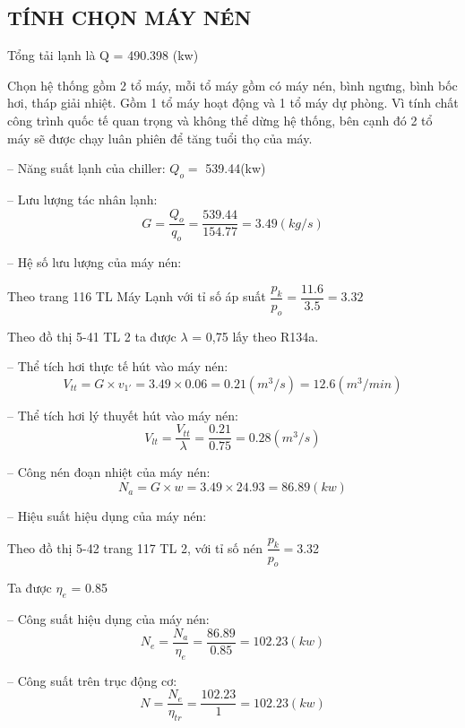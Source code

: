 \begin{table}[H]
\subsection{TÍNH CHỌN MÁY NÉN}
Tổng tải lạnh là Q = 490.398 (kw)

Chọn hệ thống gồm 2 tổ máy, mỗi tổ máy gồm có máy nén, bình ngưng, bình bốc hơi, tháp giải nhiệt. Gồm 1 tổ máy hoạt động và 1 tổ máy dự phòng. Vì tính chất công trình quốc tế quan trọng và không thể dừng hệ thống, bên cạnh đó 2 tổ máy sẽ được chạy luân phiên để tăng tuổi thọ của máy.

-- Năng suất lạnh của chiller: $Q_{o} = $ 539.44(kw)

-- Lưu lượng tác nhân lạnh: 
\begin{equation*}
	G = \dfrac{Q_{o}}{q_{o}} = \dfrac{539.44}{154.77} = 3.49 (kg/s)
\end{equation*}

-- Hệ số lưu lượng của máy nén: 

Theo trang 116 TL Máy Lạnh với tỉ số áp suất $\dfrac{p_{k}}{p_{o}} = \dfrac{11.6}{3.5} = 3.32$
	
Theo đồ thị 5-41 TL 2 ta được $\lambda$ = 0,75 lấy theo R134a.


-- Thể tích hơi thực tế hút vào máy nén: 
\begin{equation*}
	V_{tt} = G \times v_{1'} = 3.49 \times 0.06 = 0.21(m^3/s) = 12.6(m^3/min)
\end{equation*}

-- Thể tích hơi lý thuyết hút vào máy nén:
\begin{equation*}
	V_{lt} = \dfrac{V_{tt}}{\lambda} = \dfrac{0.21}{0.75} = 0.28 (m^3/s)
\end{equation*}

-- Công nén đoạn nhiệt của máy nén:
\begin{equation*}
	N_{a} = G\times w = 3.49 \times 24.93 = 86.89 (kw)
\end{equation*}

-- Hiệu suất hiệu dụng của máy nén:

Theo đồ thị 5-42 trang 117 TL 2, với tỉ số nén $ \dfrac{p_{k}}{p_{o}} =  $3.32

Ta được $\eta_{e}$ = 0.85

-- Công suất hiệu dụng của máy nén:
\begin{equation*}
	N_{e} = \dfrac{N_{a}}{\eta_{e}} = \dfrac{86.89}{0.85} = 102.23(kw)
\end{equation*}

-- Công suất trên trục động cơ:
\begin{equation*}
	N = \dfrac{N_{e}}{\eta_{tr}} = \dfrac{102.23}{1} = 102.23(kw)
\end{equation*}


\end{table}
